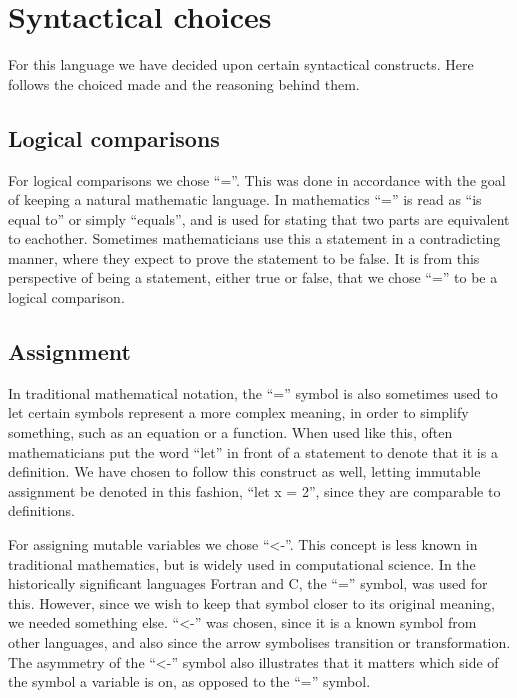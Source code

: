 \chapter{Syntactical choices}

For this language we have decided upon certain syntactical constructs. Here follows the choiced made and the reasoning behind them.

%

\section{Logical comparisons}

For logical comparisons we chose \enquote{=}. This was done in accordance with the goal of keeping a natural mathematic language. In mathematics \enquote{=} is read as \enquote{is equal to} or simply \enquote{equals}, and is used for stating that two parts are equivalent to eachother. Sometimes mathematicians use this a statement in a contradicting manner, where they expect to prove the statement to be false. It is from this perspective of being a statement, either true or false, that we chose \enquote{=} to be a logical comparison.

\section{Assignment}

In traditional mathematical notation, the \enquote{=} symbol is also sometimes used to let certain symbols represent a more complex meaning, in order to simplify something, such as an equation or a function. When used like this, often mathematicians put the word \enquote{let} in front of a statement to denote that it is a definition. We have chosen to follow this construct as well, letting immutable assignment be denoted in this fashion, \enquote{let x = 2}, since they are comparable to definitions.

For assigning mutable variables we chose \enquote{<-}. This concept is less known in traditional mathematics, but is widely used in computational science. In the historically significant languages Fortran and C, the \enquote{=} symbol, was used for this. However, since we wish to keep that symbol closer to its original meaning, we needed something else. \enquote{<-} was chosen, since it is a known symbol from other languages, and also since the arrow symbolises transition or transformation. The asymmetry of the \enquote{<-} symbol also illustrates that it matters which side of the symbol a variable is on, as opposed to the \enquote{=} symbol.


